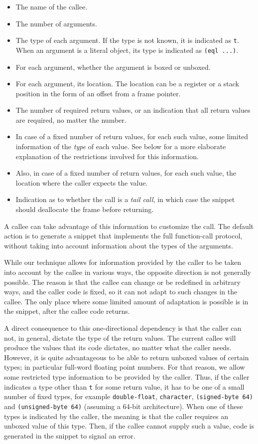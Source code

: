 \begin{itemize}
\item The name of the callee.
\item The number of arguments.
\item The type of each argument.  If the type is not known, it is
  indicated as \texttt{t}.  When an argument is a literal object, its
  type is indicated as \texttt{(eql ...)}.
\item For each argument, whether the argument is boxed or unboxed.
\item For each argument, its location.  The location can be a register
  or a stack position in the form of an offset from a frame pointer.
\item The number of required return values, or an indication that all
  return values are required, no matter the number.
\item In case of a fixed number of return values, for each such value,
  some limited information of the \emph{type} of each value.  See
  below for a more elaborate explanation of the restrictions involved
  for this information.
\item Also, in case of a fixed number of return values, for each such
  value, the location where the caller expects the value.
\item Indication as to whether the call is a \emph{tail call}, in
  which case the snippet should deallocate the frame before
  returning.
\end{itemize}

A callee can take advantage of this information to customize the
call.  The default action is to generate a snippet that implements the
full function-call protocol, without taking into account information
about the types of the arguments.

While our technique allows for information provided by the caller to
be taken into account by the callee in various ways, the opposite
direction is not generally possible.  The reason is that the callee
can change or be redefined in arbitrary ways, and the caller code is
fixed, so it can not adapt to such changes in the callee.  The
only place where some limited amount of adaptation is possible is in
the snippet, after the callee code returns.

A direct consequence to this one-directional dependency is that the
caller can not, in general, dictate the type of the return values.
The current callee will produce the values that its code dictates, no
matter what the caller needs.  However, it is quite advantageous to be
able to return unboxed values of certain types; in particular
full-word floating point numbers.  For that reason, we allow some
restricted type information to be provided by the caller.
Thus, if the caller indicates a type other than \texttt{t} for some
return value, it has to be one of a small number of fixed types, for
example \texttt{double-float}, \texttt{character},
\texttt{(signed-byte 64)} and \texttt{(unsigned-byte 64)} (assuming a
64-bit architecture).  When one of these types is indicated by the
caller, the meaning is that the caller requires an unboxed value of
this type.  Then, if the callee cannot supply such a value, code is
generated in the snippet to signal an error.

